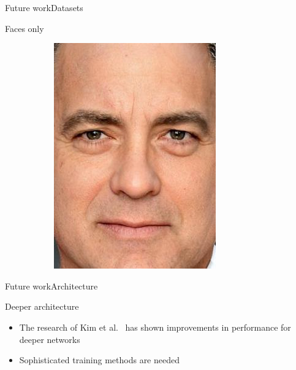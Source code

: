 \begin{frame}{Future work}{Datasets}
\begin{block}{Faces only}
\begin{figure}
\begin{subfigure}[b]{0.15\textwidth}
                \includegraphics[width=\textwidth]{sections/malte_slides/crop1}
            \end{subfigure}
        \end{figure}
    \end{block}
\end{frame}

\begin{frame}{Future work}{Architecture}
    \begin{block}{Deeper architecture}
        \begin{itemize}
            \item The research of Kim et al.\footnotemark ~ has shown improvements in performance for deeper networks
            \item Sophisticated training methods are needed
        \end{itemize}
    \end{block}
\end{frame}

